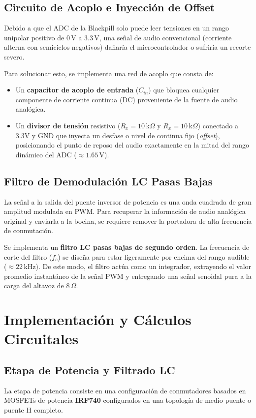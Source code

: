 \documentclass[pdflatex,sn-mathphys-num]{sn-jnl}%
\begin{document}
\subsection{Circuito de Acoplo e Inyección de Offset}
Debido a que el ADC de la Blackpill solo puede leer tensiones en un rango unipolar positivo de $0$\,V a $3.3$\,V, una señal de audio convencional (corriente alterna con semiciclos negativos) dañaría el microcontrolador o sufriría un recorte severo. 

Para solucionar esto, se implementa una red de acoplo que consta de:
\begin{itemize}
    \item Un \textbf{capacitor de acoplo de entrada} ($C_{in}$) que bloquea cualquier componente de corriente continua (DC) proveniente de la fuente de audio analógica.
    \item Un \textbf{divisor de tensión} resistivo ($R_x = 10$\,k$\Omega$ y $R_x = 10$\,k$\Omega$) conectado a 3.3V y GND que inyecta un desfase o nivel de continua fijo (\textit{offset}), posicionando el punto de reposo del audio exactamente en la mitad del rango dinámico del ADC ($\approx 1.65$\,V). 
\end{itemize}

\subsection{Filtro de Demodulación LC Pasas Bajas}
La señal a la salida del puente inversor de potencia es una onda cuadrada de gran amplitud modulada en PWM. Para recuperar la información de audio analógica original y enviarla a la bocina, se requiere remover la portadora de alta frecuencia de conmutación.

Se implementa un \textbf{filtro LC pasas bajas de segundo orden}. La frecuencia de corte del filtro ($f_c$) se diseña para estar ligeramente por encima del rango audible ($\approx 22$\,kHz). De este modo, el filtro actúa como un integrador, extrayendo el valor promedio instantáneo de la señal PWM y entregando una señal senoidal pura a la carga del altavoz de 8\,$\Omega$.

\section{Implementación y Cálculos Circuitales}\label{sec:implementacion}

\subsection{Etapa de Potencia y Filtrado LC}
La etapa de potencia consiste en una configuración de conmutadores basados en MOSFETs de potencia \textbf{IRF740} configurados en una topología de medio puente o puente H completo. 
\end{document}

